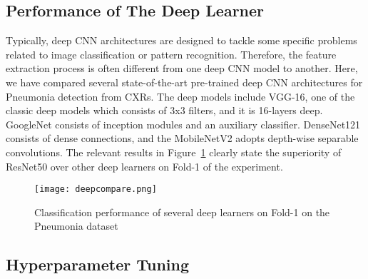 \documentclass[final,3p,times]{elsarticle}
\begin{document}
\subsection{Performance of The Deep Learner}
{Typically,} deep CNN architectures are designed to tackle some specific problems related to image classification or pattern recognition. {Therefore,} the feature extraction process is often different from one deep CNN model to another. Here, we have compared several state-of-the-art pre-trained deep CNN architectures for Pneumonia detection from CXRs. The deep models include VGG-16, one of the classic deep models which consists of 3x3 filters, and {it is 16-layers} deep. GoogleNet consists of inception modules and an auxiliary classifier. DenseNet121 consists of dense {connections,} and the MobileNetV2 adopts {depth-wise} separable convolutions. The relevant results in Figure~\ref{fig:deepcompare} clearly state the superiority of ResNet50 over other deep learners on Fold-1 of the experiment.
\begin{figure}
    \centering
    \texttt{[image: deepcompare.png]}
    \caption{Classification performance of several deep learners on Fold-1 on the Pneumonia dataset}
    \label{fig:deepcompare}
\end{figure}
\subsection{Hyperparameter Tuning}
\end{document}
